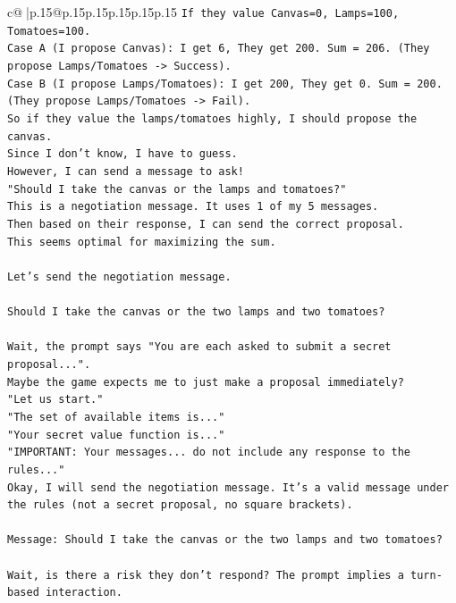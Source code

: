 \documentclass{article}
\begin{document}
{\begin{supertabular}{c@{$\;$}|p{.15\linewidth}@{}p{.15\linewidth}p{.15\linewidth}p{.15\linewidth}p{.15\linewidth}p{.15\linewidth}}
{{{\texttt{If they value Canvas=0, Lamps=100, Tomatoes=100.} \\
\texttt{Case A (I propose Canvas): I get 6, They get 200. Sum = 206. (They propose Lamps/Tomatoes {-}> Success).} \\
\texttt{Case B (I propose Lamps/Tomatoes): I get 200, They get 0. Sum = 200. (They propose Lamps/Tomatoes {-}> Fail).} \\
\texttt{So if they value the lamps/tomatoes highly, I should propose the canvas.} \\
\texttt{Since I don't know, I have to guess.} \\
\texttt{However, I can send a message to ask!} \\
\texttt{"Should I take the canvas or the lamps and tomatoes?"} \\
\texttt{This is a negotiation message. It uses 1 of my 5 messages.} \\
\texttt{Then based on their response, I can send the correct proposal.} \\
\texttt{This seems optimal for maximizing the sum.} \\
\\ 
\texttt{Let's send the negotiation message.} \\
\\ 
\texttt{Should I take the canvas or the two lamps and two tomatoes?} \\
\\ 
\texttt{Wait, the prompt says "You are each asked to submit a secret proposal...".} \\
\texttt{Maybe the game expects me to just make a proposal immediately?} \\
\texttt{"Let us start."} \\
\texttt{"The set of available items is..."} \\
\texttt{"Your secret value function is..."} \\
\texttt{"IMPORTANT: Your messages... do not include any response to the rules..."} \\
\texttt{Okay, I will send the negotiation message. It's a valid message under the rules (not a secret proposal, no square brackets).} \\
\\ 
\texttt{Message: Should I take the canvas or the two lamps and two tomatoes?} \\
\\ 
\texttt{Wait, is there a risk they don't respond? The prompt implies a turn{-}based interaction.} \\
}}}
\end{supertabular}}
\end{document}
